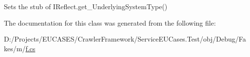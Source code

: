 Sets the stub of I\-Reflect.\-get\-\_\-\-Underlying\-System\-Type()



The documentation for this class was generated from the following file\-:\begin{DoxyCompactItemize}
\item 
D\-:/\-Projects/\-E\-U\-C\-A\-S\-E\-S/\-Crawler\-Framework/\-Service\-E\-U\-Cases.\-Test/obj/\-Debug/\-Fakes/m/\hyperlink{m_2f_8cs}{f.\-cs}\end{DoxyCompactItemize}
